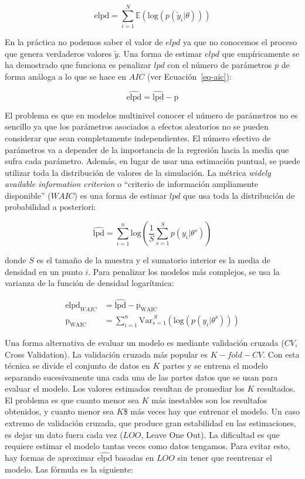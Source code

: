 \documentclass[
  12pt,
  a4paper,
  extrafontsizes,
  onecolumn,
  openright,
  table]{memoir}
\begin{document}
\[
\mathrm{elpd} = \sum_{i=1}^{N} \mathbb{E}(\mathrm{log} (p(\tilde{y}_i | \theta)))
\]

En la práctica no podemos saber el valor de \(elpd\) ya que no conocemos
el proceso que genera verdaderos valores \(\tilde{y}\). Una forma de
estimar \(elpd\) que empíricamente se ha demostrado que funciona es
penalizar \(lpd\) con el número de parámetros \(p\) de forma análoga a
lo que se hace en \(AIC\) (ver Ecuación~\ref{eq-aic}):

\[
\widehat{\mathrm{elpd}} = \widehat{\mathrm{lpd}} - \mathrm{p}
\]

El problema es que en modelos multinivel conocer el número de parámetros
no es sencillo ya que los parámetros asociados a efectos aleatorios no
se pueden considerar que sean completamente independientes. El número
efectivo de parámetros va a depender de la importancia de la regresión
hacia la media que sufra cada parámetro. Además, en lugar de usar una
estimación puntual, se puede utilizar toda la distribución de valores de
la simulación. La métrica \emph{widely available information criterion}
o \enquote{criterio de información ampliamente disponible} (\(WAIC\)) es
una forma de estimar \(lpd\) que usa toda la distribución de
probabilidad a posteriori:

\[
\widehat{\mathrm{lpd}} = \sum_{i=1}^{n} \mathrm{log} (\frac{1}{S} \sum_{s=1}^{S} p(y_{i} | \theta^s))
\]

donde \(S\) es el tamaño de la muestra y el sumatorio interior es la
media de densidad en un punto \(i\). Para penalizar los modelos más
complejos, se usa la varianza de la función de densidad logarítmica:

\[
\begin{aligned}
\widehat{\mathrm{elpd}}_{WAIC} &= \widehat{\mathrm{lpd}} - \mathrm{p_{WAIC}} \\
\mathrm{p_{\mathrm{WAIC}}} &= \sum_{i=1}^{n} \mathrm{Var}_{s=1}^{\,S}(\mathrm{log} (p(y_{i} | \theta^s)))
\end{aligned}
\]

Una forma alternativa de evaluar un modelo es mediante validación
cruzada (\(CV\), Cross Validation). La validación cruzada más popular es
\(K-fold-CV\). Con esta técnica se divide el conjunto de datos en \(K\)
partes y se entrena el modelo separando sucesivamente una cada una de
las partes datos que se usan para evaluar el modelo. Los valores
estimados resultan de promediar los \(K\) resultados. El problema es que
cuanto menor sea \(K\) más inestables son los resultafos obtenidos, y
cuanto menor sea \(K\)\$ más veces hay que entrenar el modelo. Un caso
extremo de validación cruzada, que produce gran estabilidad en las
estimaciones, es dejar un dato fuera cada vez (\(LOO\), Leave One Out).
La dificultad es que requiere estimar el modelo tantas veces como datos
tengamos. Para evitar esto, hay formas de aproximar
\(\widehat{\mathrm{elpd}}\) basadas en \(LOO\) sin tener que reentrenar
el modelo. Las fórmula es la siguiente:
\end{document}
